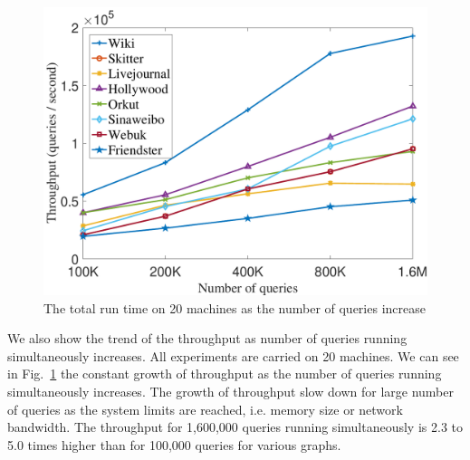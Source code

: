 \begin{figure}[t]
    \centering
    \includegraphics[width=\linewidth]{./figures/scale_query_throughput.pdf}
    \caption{The total run time on 20 machines as the number of queries increase}
    \label{fig:scale_query}
\end{figure}

We also show the trend of the throughput as number of queries running simultaneously increases. All experiments are carried on 20 machines. We can see in Fig.~\ref{fig:scale_query} the constant growth of throughput as the number of queries running simultaneously increases. The growth of throughput slow down for large number of queries as the system limits are reached, i.e. memory size or network bandwidth. The throughput for 1,600,000 queries running simultaneously is 2.3 to 5.0 times higher than for 100,000 queries for various graphs.
